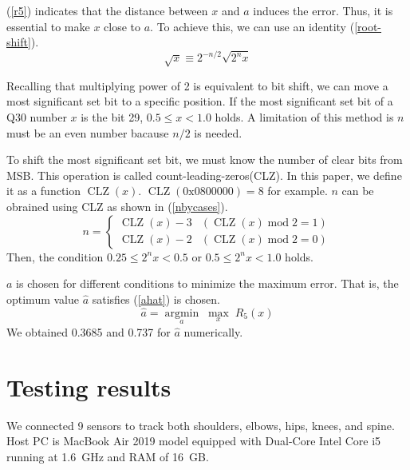 \documentclass[journal]{IEEEtran}
\begin{document}
(\ref{r5}) indicates that the distance between \(x\) and \(a\) induces the error.
Thus, it is essential to make \(x\) close to \(a\).
To achieve this, we can use an identity (\ref{root-shift}).
\begin{equation}
    \sqrt{x} \equiv 2^{-n/2}\sqrt{2^n x} \label{root-shift}
\end{equation}

Recalling that multiplying power of 2 is equivalent to bit shift, we can move a most significant set bit to a specific position.
If the most significant set bit of a Q30 number \(x\) is the bit 29, \(0.5 \leq x < 1.0\) holds.
A limitation of this method is \(n\) must be an even number bacause \(n/2\) is needed.

To shift the most significant set bit, we must know the number of clear bits from MSB.
This operation is called count-leading-zeros(CLZ).
In this paper, we define it as a function \(\operatorname{CLZ}(x)\).
\(\operatorname{CLZ}(\mathrm{0x0800000}) = 8\) for example.
\(n\) can be obrained using CLZ as shown in (\ref{nbycases}).
\begin{equation}
    n = \begin{cases}
        \operatorname{CLZ}(x) - 3 & (\operatorname{CLZ}(x)\operatorname{mod}2 = 1) \\
        \operatorname{CLZ}(x) - 2 & (\operatorname{CLZ}(x)\operatorname{mod}2 = 0)
    \end{cases} \label{nbycases}
\end{equation}
Then, the condition \(0.25 \leq 2^nx < 0.5\) or \(0.5 \leq 2^nx < 1.0\) holds.

\(a\) is chosen for different conditions to minimize the maximum error.
That is, the optimum value \(\hat{a}\) satisfies (\ref{ahat}) is chosen.
\begin{equation}
    \hat{a} = \underset{a}{\operatorname{argmin}}\;\underset{x}{\operatorname{max}}\;R_5(x) \label{ahat}
\end{equation}
We obtained 0.3685 and 0.737 for \(\hat{a}\) numerically.

\section{Testing results}
We connected 9 sensors to track both shoulders, elbows, hips, knees, and spine.
Host PC is MacBook Air 2019 model equipped with Dual-Core Intel Core i5 running at \SI{1.6}{\GHz} and RAM of \SI{16}{GB}.
\end{document}
